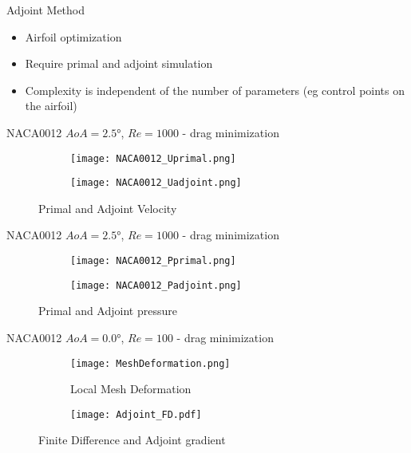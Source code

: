 \begin{frame}{Adjoint Method}
    \begin{itemize}
        \item Airfoil optimization
        \item Require primal and adjoint simulation
        \item Complexity is independent of the number of parameters (eg control points on the airfoil)
    \end{itemize}

\end{frame}


\begin{frame}{NACA0012 $AoA=\ang{2.5}$, $Re=1000$ - drag minimization}
    \begin{figure}[h]
        \centering
        \begin{subfigure}[h]{0.45\textwidth}
            \centering
            \texttt{[image: NACA0012\_Uprimal.png]}
        \end{subfigure}
        \hfill
        \begin{subfigure}[h]{0.45\textwidth}
            \centering
            \texttt{[image: NACA0012\_Uadjoint.png]}
        \end{subfigure}
        \caption{Primal and Adjoint Velocity}
    \end{figure}
\end{frame}



\begin{frame}{NACA0012 $AoA=\ang{2.5}$, $Re=1000$ - drag minimization}
    \begin{figure}[h]
        \centering
        \begin{subfigure}[h]{0.45\textwidth}
            \centering
            \texttt{[image: NACA0012\_Pprimal.png]}
        \end{subfigure}
        \hfill
        \begin{subfigure}[h]{0.45\textwidth}
            \centering
            \texttt{[image: NACA0012\_Padjoint.png]}
        \end{subfigure}
        \caption{Primal and Adjoint pressure}
    \end{figure}
\end{frame}


\begin{frame}{NACA0012 $AoA=\ang{0.0}$, $Re=100$ - drag minimization}
    \begin{figure}[h]
        \centering
        \begin{subfigure}[h]{0.45\textwidth}
            \centering
            \texttt{[image: MeshDeformation.png]}
            \caption{Local Mesh Deformation}
        \end{subfigure}
        \hfill
        \begin{subfigure}[h]{0.45\textwidth}
            \centering
            \texttt{[image: Adjoint\_FD.pdf]}
        \end{subfigure}
        \caption{Finite Difference and Adjoint gradient}
    \end{figure}
\end{frame}